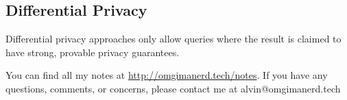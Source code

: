 \documentclass{math}
\begin{document}
\subsection*{Differential Privacy}
Differential privacy approaches only allow queries where the result is claimed
to have strong, provable privacy guarantees.

\begin{center}
  You can find all my notes at \url{http://omgimanerd.tech/notes}. If you have
  any questions, comments, or concerns, please contact me at
  alvin@omgimanerd.tech
\end{center}
\end{document}
